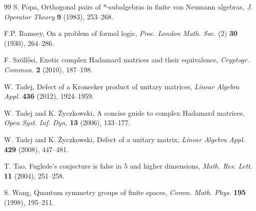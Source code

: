 \documentclass[11pt,a4paper]{article}
\theoremstyle{plain}
\theoremstyle{definition}
\numberwithin{equation}{section}
\begin{document}
\begin{thebibliography}{99}
 S. Popa, Orthogonal pairs of $*$-subalgebras in finite von Neumann algebras, {\em J. Operator Theory} {\bf 9} (1983), 253--268.

 F.P. Ramsey, On a problem of formal logic, {\em Proc. London Math. Soc.} (2) {\bf 30} (1930), 264--286.

 F. Sz\"oll\H{o}si, Exotic complex Hadamard matrices and their equivalence, {\em Cryptogr. Commun.} {\bf 2} (2010), 187--198.

 W. Tadej, Defect of a Kronecker product of unitary matrices, {\em Linear Algebra Appl.} {\bf 436} (2012), 1924--1959.

 W. Tadej and K. \.Zyczkowski, A concise guide to complex Hadamard matrices, {\em Open Syst. Inf. Dyn.} {\bf 13} (2006), 133--177.

 W. Tadej and K. \.Zyczkowski, Defect of a unitary matrix, {\em Linear Algebra Appl.} {\bf 429} (2008), 447--481.

 T. Tao, Fuglede's conjecture is false in 5 and higher dimensions, {\em Math. Res. Lett.} {\bf 11} (2004), 251--258.

 S. Wang, Quantum symmetry groups of finite spaces, {\em Comm. Math. Phys.} {\bf 195} (1998), 195--211.

\end{thebibliography}
\endgroup
\end{document}
